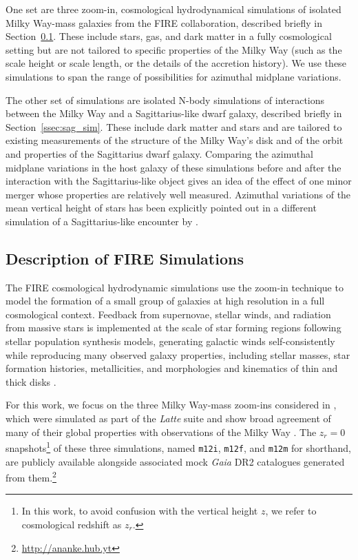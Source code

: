 \documentclass[twocolumn]{aastex62}
\newcommand{\mi}{\texttt{m12i}}
\newcommand{\mf}{\texttt{m12f}}
\newcommand{\mm}{\texttt{m12m}}
\newcommand{\z}{z_r}
\begin{document}
One set are three zoom-in, cosmological hydrodynamical simulations of isolated Milky Way-mass galaxies from the FIRE collaboration, described briefly in Section~\ref{ssec:cosmozoom}. These include stars, gas, and dark matter in a fully cosmological setting but are not tailored to specific properties of the Milky Way (such as the scale height or scale length, or the details of the accretion history). We use these simulations to span the range of possibilities for azimuthal midplane variations.

The other set of simulations are isolated N-body simulations of interactions between the Milky Way and a Sagittarius-like dwarf galaxy, described briefly in Section~\ref{ssec:sag_sim}. These include dark matter and stars and are tailored to existing measurements of the structure of the Milky Way's disk and of the orbit and properties of the Sagittarius dwarf galaxy. Comparing the azimuthal midplane variations in the host galaxy of these simulations before and after the interaction with the Sagittarius-like object gives an idea of the effect of one minor merger whose properties are relatively well measured. Azimuthal variations of the mean vertical height of stars has been explicitly pointed out in a different simulation of a Sagittarius-like encounter by \citet{2013MNRAS.429..159G}.

\subsection{Description of FIRE Simulations} \label{ssec:cosmozoom}
The FIRE cosmological hydrodynamic simulations
\citep{2014MNRAS.445..581H,2018MNRAS.480..800H} use the zoom-in technique
\citep[e.g.,][]{1993ApJ...412..455K,2014MNRAS.437.1894O} to model the formation
of a small group of galaxies at high resolution in a full cosmological
context. Feedback from supernovae, stellar winds, and radiation from massive
stars is implemented at the scale of star forming regions following stellar
population synthesis models, generating galactic winds self-consistently
\citep{2015MNRAS.454.2691M, 2017MNRAS.470.4698A} while reproducing many
observed galaxy properties, including stellar masses, star formation
histories, metallicities, and morphologies and kinematics of thin and thick
disks \citep{2014MNRAS.445..581H, 2016MNRAS.456.2140M, 2017MNRAS.467.2430M,
2016ApJ...827L..23W, 2018MNRAS.481.4133G, 2018MNRAS.480..800H}.

For this work,
we focus on the three Milky Way-mass zoom-ins considered in
\citet{2018arXiv180610564S}, which were simulated as part of the
\textit{Latte} suite and show broad agreement of many of their global
properties with observations of the Milky Way \citep{2016ApJ...827L..23W,
2018MNRAS.481.4133G}. The $\z = 0$ snapshots\footnote{In this work, to avoid
confusion with the vertical height $z$, we refer to cosmological redshift as
$\z$.} of these three simulations, named \mi{}, \mf{}, and \mm{} for
shorthand, are publicly available alongside associated mock \textit{Gaia} DR2
catalogues generated from them.\footnote{\url{http://ananke.hub.yt}}
\end{document}

